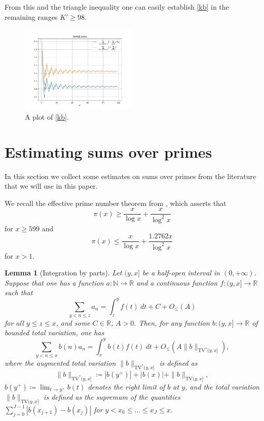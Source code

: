 \documentclass[12pt,a4paper,reqno]{amsart}
\numberwithin{equation}{section}
\theoremstyle{plain}
\newtheorem{lemma}[theorem]{Lemma}
\theoremstyle{definition}
\newcommand\R{\mathbb{R}}
\newcommand\N{\mathbb{N}}
\begin{document}
    From this and the triangle inequality one can easily establish \eqref{kb} in the remaining ranges $K' \geq 98$.
  
  \begin{figure}
  \centering
  \includegraphics[width=0.5\textwidth]{discrepancy.png}
  \caption{A plot of \eqref{kb}.}
  \label{fig:kb}
  \end{figure}

\section{Estimating sums over primes}\label{primes-sec}

In this section we collect some estimates on sums over primes from the literature that we will use in this paper.

We recall the effective prime number theorem from \cite[Corollary 5.2]{dusart}, which asserts that
\begin{equation}\label{pi-lower}
  \pi(x) \geq \frac{x}{\log x} + \frac{x}{\log^2 x}
\end{equation}
for $x \geq 599$ and
\begin{equation}\label{pi-upper}
  \pi(x) \leq \frac{x}{\log x} + \frac{1.2762 x}{\log^2 x}
\end{equation}
for $x >1$.  


\begin{lemma}[Integration by parts]\label{integ-lemma}  Let $(y,x]$ be a half-open interval in $(0,+\infty)$.  Suppose that one has a function $a \colon \N \to \R$ and a continuous function $f: (y,x] \to \R$ such that 
  $$ \sum_{y < n \leq z} a_n = \int_z^y f(t)\ dt + C + O_{\leq}(A)$$
  for all $y \leq z \leq x$, and some $C \in \R$, $A>0$.  Then, for any function $b: (y,x] \to \R$ of bounded total variation, one has
\begin{equation}\label{tve}
   \sum_{y < n \leq x} b(n) a_n = \int_x^y b(t) f(t)\ dt + O_{\leq}(A\|b\|_{\mathrm{TV}^*(y,x]}),
\end{equation}
where the augmented total variation $\|b\|_{\mathrm{TV}^*(y,x]}$ is defined as
$$
\|b\|_{\mathrm{TV}^*(y,x]}
\coloneqq |b(y^+)| + |b(x)| + \|b\|_{\mathrm{TV}(y,x]},$$
$b(y^+) \coloneqq \lim_{t \to y^+} b(t)$ denotes the right limit of $b$ at $y$, and the total variation $\|b\|_{\mathrm{TV}(y,x]}$ is defined as the supremum of the quantities $\sum_{j=0}^{J-1} |b(x_{j+1})-b(x_j)|$ for $y < x_0 \leq \dots \leq x_J \leq x$.
\end{lemma}
\end{document}
